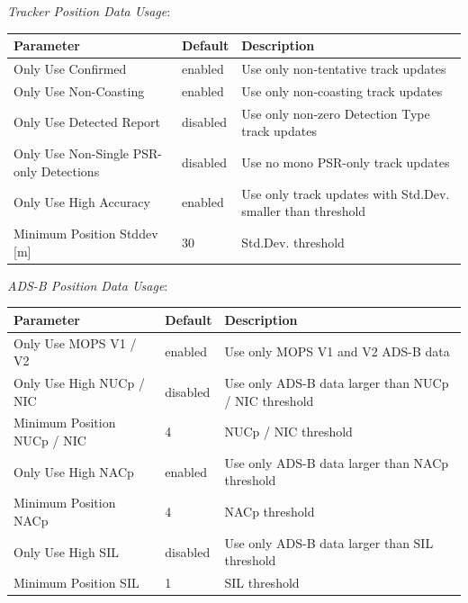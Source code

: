 \textit{Tracker Position Data Usage}:
\begin{table}[H]
    \center
    \begin{tabularx}{\textwidth}{ | l | l | X |}
        \hline
        \textbf{Parameter} & \textbf{Default} & \textbf{Description} \\ \hline
        Only Use Confirmed & enabled & Use only non-tentative track updates \\ \hline
        Only Use Non-Coasting & enabled & Use only non-coasting track updates \\ \hline
        Only Use Detected Report & disabled & Use only non-zero Detection Type track updates \\ \hline
        Only Use Non-Single PSR-only Detections & disabled & Use no mono PSR-only track updates \\ \hline
        Only Use High Accuracy & enabled & Use only track updates with Std.Dev. smaller than threshold \\ \hline
        Minimum Position Stddev [m] & 30 & Std.Dev. threshold \\ \hline
    \end{tabularx}
\end{table}

\textit{ADS-B Position Data Usage}:
\begin{table}[H]
    \center
    \begin{tabularx}{\textwidth}{ | l | l | X |}
        \hline
        \textbf{Parameter} & \textbf{Default} & \textbf{Description} \\ \hline
        Only Use MOPS V1 / V2 & enabled & Use only MOPS V1 and V2 ADS-B data \\ \hline
        Only Use High NUCp / NIC & disabled & Use only ADS-B data larger than NUCp / NIC threshold \\ \hline
        Minimum Position NUCp / NIC & 4 &  NUCp / NIC threshold \\ \hline
        Only Use High NACp & enabled & Use only ADS-B data larger than NACp threshold \\ \hline
        Minimum Position NACp & 4 & NACp threshold \\ \hline
        Only Use High SIL & disabled & Use only ADS-B data larger than SIL threshold \\ \hline
        Minimum Position SIL & 1 & SIL threshold \\ \hline
    \end{tabularx}
\end{table}

